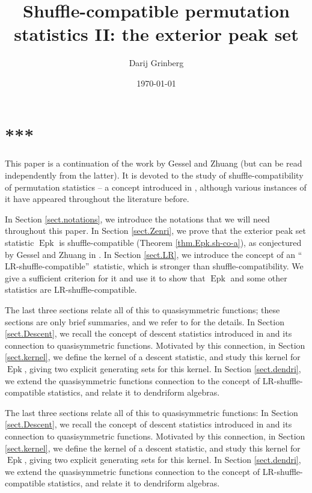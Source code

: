 \documentclass[numbers=enddot,12pt,final,onecolumn,notitlepage]{scrartcl}%
\theoremstyle{definition}
\newenvironment{verlong}{}{}
\newenvironment{vershort}{}{}
\begin{document}
\title{Shuffle-compatible permutation statistics II: the exterior peak set}
\author{Darij Grinberg}
\date{\today}
\maketitle
\tableofcontents

\section*{***}

This paper is a continuation of the work \cite{part1} by Gessel and Zhuang
(but can be read independently from the latter). It is devoted to the study of
shuffle-compatibility of permutation statistics -- a concept introduced in
\cite{part1}, although various instances of it have appeared throughout the
literature before.

In Section \ref{sect.notations}, we introduce the notations that we will need
throughout this paper. In Section \ref{sect.Zenri}, we prove that the exterior
peak set statistic $\operatorname*{Epk}$ is shuffle-compatible (Theorem
\ref{thm.Epk.sh-co-a}), as conjectured by Gessel and Zhuang in \cite{part1}.
In Section \ref{sect.LR}, we introduce the concept of an \textquotedblleft
LR-shuffle-compatible\textquotedblright\ statistic, which is stronger than
shuffle-compatibility. We give a sufficient criterion for it and use it to
show that $\operatorname*{Epk}$ and some other statistics are
LR-shuffle-compatible.

\begin{vershort}
The last three sections relate all of this to quasisymmetric functions; these
sections are only brief summaries, and we refer to \cite{verlong} for the
details. In Section \ref{sect.Descent}, we recall the concept of descent
statistics introduced in \cite{part1} and its connection to quasisymmetric
functions. Motivated by this connection, in Section \ref{sect.kernel}, we
define the kernel of a descent statistic, and study this kernel for
$\operatorname*{Epk}$, giving two explicit generating sets for this kernel. In
Section \ref{sect.dendri}, we extend the quasisymmetric functions connection
to the concept of LR-shuffle-compatible statistics, and relate it to
dendriform algebras.
\end{vershort}

\begin{verlong}
The last three sections relate all of this to quasisymmetric functions: In
Section \ref{sect.Descent}, we recall the concept of descent statistics
introduced in \cite{part1} and its connection to quasisymmetric functions.
Motivated by this connection, in Section \ref{sect.kernel}, we define the
kernel of a descent statistic, and study this kernel for $\operatorname*{Epk}%
$, giving two explicit generating sets for this kernel. In Section
\ref{sect.dendri}, we extend the quasisymmetric functions connection to the
concept of LR-shuffle-compatible statistics, and relate it to dendriform algebras.
\end{verlong}
\end{document}
